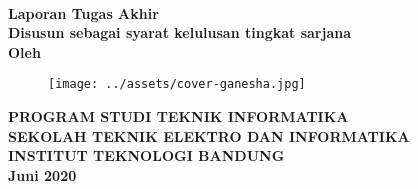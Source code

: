 \documentclass[../index.tex]{subfiles}
\begin{document}
\clearpage
\pagestyle{empty}


{\selectfont%
	\begin{center}

		\smallskip

		\large{\bfseries \MakeUppercase{\thetitle}}
		\\[2\baselineskip]

		\large{\bfseries Laporan Tugas Akhir}
		\\[\baselineskip]

		\normalsize{ \bfseries
			Disusun sebagai syarat kelulusan tingkat sarjana
		}
		\\[3\baselineskip]

		\normalsize{ \bfseries Oleh\\}
		\large{ \bfseries \MakeUppercase{\theauthor}}

		\vfill
		\begin{figure}[h]
			\centering
			\texttt{[image: ../assets/cover-ganesha.jpg]}
		\end{figure}
		\vfill

		\large{ \bfseries
			\uppercase{
				Program Studi Teknik Informatika \\
				Sekolah Teknik Elektro dan Informatika \\
				Institut Teknologi Bandung\\
			}
			Juni 2020
		}

	\end{center}
}%

\restoregeometry
\clearpage
\end{document}
